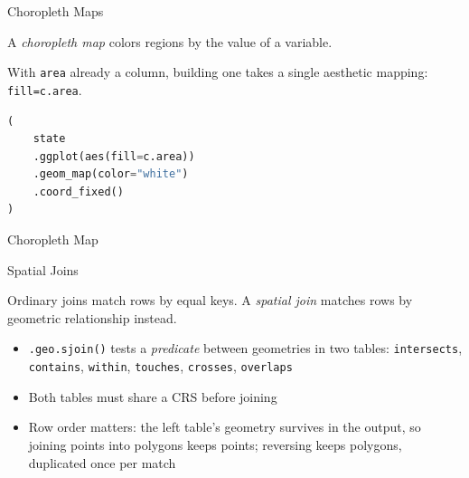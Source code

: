 \documentclass[8pt,aspectratio=169]{beamer}
\begin{document}
\begin{frame}[fragile]{Choropleth Maps}
\begin{splitcode}{%

A \textit{choropleth map} colors regions by the value of a variable.

With \texttt{area} already a column, building one takes a single aesthetic mapping: \texttt{fill=c.area}.

}
\begin{lstlisting}[language=Python]
(
    state
    .ggplot(aes(fill=c.area))
    .geom_map(color="white")
    .coord_fixed()
)
\end{lstlisting}
\end{splitcode}
\end{frame}

\begin{rightframe}{Choropleth Map}
\end{rightframe}

\begin{textframe}{Spatial Joins}

Ordinary joins match rows by equal keys. A \textit{spatial join} matches rows by geometric relationship instead.

\begin{itemize}
\item \texttt{.geo.sjoin()} tests a \textit{predicate} between geometries in two tables: \texttt{intersects}, \texttt{contains}, \texttt{within}, \texttt{touches}, \texttt{crosses}, \texttt{overlaps}
\item Both tables must share a CRS before joining
\item Row order matters: the left table's geometry survives in the output, so joining points into polygons keeps points; reversing keeps polygons, duplicated once per match
\end{itemize}

\end{textframe}
\end{document}

